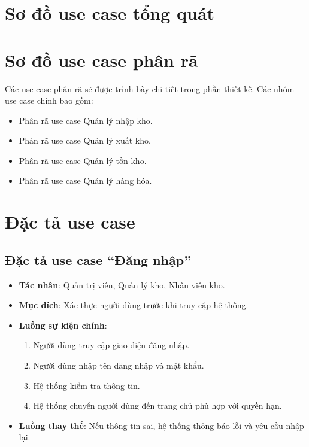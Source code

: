 \section{Sơ đồ use case tổng quát}



\section{Sơ đồ use case phân rã}

Các use case phân rã sẽ được trình bày chi tiết trong phần thiết kế. Các nhóm use case chính bao gồm:

\begin{itemize}[leftmargin=1.5cm]
    \item Phân rã use case Quản lý nhập kho.
    \item Phân rã use case Quản lý xuất kho.
    \item Phân rã use case Quản lý tồn kho.
    \item Phân rã use case Quản lý hàng hóa.
\end{itemize}

\section{Đặc tả use case}

\subsection{Đặc tả use case ``Đăng nhập''}

\begin{itemize}[leftmargin=1.5cm]
    \item \textbf{Tác nhân}: Quản trị viên, Quản lý kho, Nhân viên kho.
    \item \textbf{Mục đích}: Xác thực người dùng trước khi truy cập hệ thống.
    \item \textbf{Luồng sự kiện chính}:
    \begin{enumerate}
        \item Người dùng truy cập giao diện đăng nhập.
        \item Người dùng nhập tên đăng nhập và mật khẩu.
        \item Hệ thống kiểm tra thông tin.
        \item Hệ thống chuyển người dùng đến trang chủ phù hợp với quyền hạn.
    \end{enumerate}
    \item \textbf{Luồng thay thế}: Nếu thông tin sai, hệ thống thông báo lỗi và yêu cầu nhập lại.
\end{itemize}


